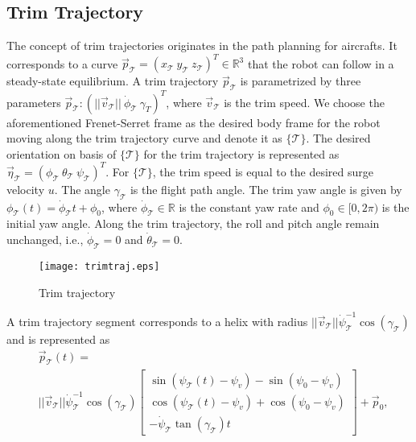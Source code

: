 \subsection{Trim Trajectory}
The concept of trim trajectories originates in the path planning for aircrafts. It corresponds to a curve $\vec{p}_{\mathcal{T}}=(x_{\mathcal{T}}~y_{\mathcal{T}}~z_{\mathcal{T}})^{T}
\in \mathbb{R}^{3}$ that the robot can follow in a steady-state equilibrium. A trim trajectory $\vec{p}_{\mathcal{T}}$ is parametrized by three parameters $\vec{p}_{\mathcal{T}}: (||\vec{v}_{\mathcal{T}}||~\dot{\phi}_{\mathcal{T}}~\gamma_{T})^{T}$, where $\vec{v}_{\mathcal{T}}$ is the trim speed. We choose the aforementioned Frenet-Serret frame as the desired body frame for the robot moving along the trim trajectory curve and denote it as $\lbrace \mathcal{T} \rbrace$. The desired orientation on basis of $\lbrace \mathcal{T} \rbrace$ for the trim trajectory is represented as $\vec{\eta}_{\mathcal{T}}=(\phi_{\mathcal{T}}~\theta_{\mathcal{T}}~\psi_{\mathcal{T}})^{T}$. For $\lbrace \mathcal{T} \rbrace$, the trim speed is equal to the desired surge velocity $u$. The angle $\gamma_{\mathcal{T}}$ is the flight path angle. The trim yaw angle is given by $\phi_{\mathcal{T}}(t)=\dot{\phi}_{\mathcal{T}}t+\phi_{0}$, where $\dot{\phi}_{\mathcal{T}}\in \mathbb{R}$ is the constant yaw rate and $\phi_{0}\in [0,2\pi)$ is the initial yaw angle. Along the trim trajectory, the roll and pitch angle remain unchanged, i.e., $\dot{\phi}_{\mathcal{T}}=0$ and $\dot{\theta}_{\mathcal{T}}=0$. 
\begin{figure}[thpb]
\centering
\texttt{[image: trimtraj.eps]}
\caption{Trim trajectory}
\label{FinGeo}
\end{figure} 
A trim trajectory segment corresponds to a helix with radius $||\vec{v}_{\mathcal{T}}||\dot{\psi}_{\mathcal{T}}^{-1}\cos(\gamma_{\mathcal{T}})$ and is represented as
\begin{align}
&\vec{p}_{\mathcal{T}}(t)= \nonumber
\\&||\vec{v}_{\mathcal{T}}||\dot{\psi}_{\mathcal{T}}^{-1}\cos(\gamma_{\mathcal{T}})
\begin{bmatrix}
\sin(\psi_{\mathcal{T}}(t)-\psi_{v})-\sin(\psi_{0}-\psi_{v}) \\
\cos(\psi_{\mathcal{T}}(t)-\psi_{v})+\cos(\psi_{0}-\psi_{v}) \\
-\dot{\psi}_{\mathcal{T}}\tan(\gamma_{\mathcal{T}})t
\end{bmatrix}+
\vec{p}_{0},\label{EQ:pT}
\end{align}
